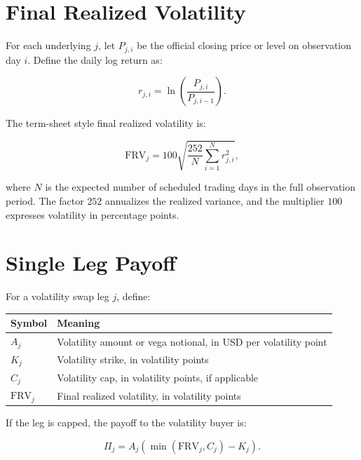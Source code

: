 \documentclass[11pt]{article}
\begin{document}
\section{Final Realized Volatility}

For each underlying $j$, let $P_{j,i}$ be the official closing price or level on observation day $i$. Define the daily log return as:

\begin{equation}
    r_{j,i}
    =
    \ln \left( \frac{P_{j,i}}{P_{j,i-1}} \right).
\end{equation}

The term-sheet style final realized volatility is:

\begin{equation}
    \mathrm{FRV}_j
    =
    100
    \sqrt{
        \frac{252}{N}
        \sum_{i=1}^{N} r_{j,i}^{2}
    },
\end{equation}

where $N$ is the expected number of scheduled trading days in the full observation period. The factor $252$ annualizes the realized variance, and the multiplier $100$ expresses volatility in percentage points.

\section{Single Leg Payoff}

For a volatility swap leg $j$, define:

\begin{center}
\begin{tabular}{ll}
\toprule
Symbol & Meaning \\
\midrule
$A_j$ & Volatility amount or vega notional, in USD per volatility point \\
$K_j$ & Volatility strike, in volatility points \\
$C_j$ & Volatility cap, in volatility points, if applicable \\
$\mathrm{FRV}_j$ & Final realized volatility, in volatility points \\
\bottomrule
\end{tabular}
\end{center}

If the leg is capped, the payoff to the volatility buyer is:

\begin{equation}
    \Pi_j
    =
    A_j
    \left(
        \min(\mathrm{FRV}_j, C_j) - K_j
    \right).
\end{equation}
\end{document}
